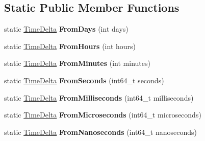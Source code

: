 \subsection*{Static Public Member Functions}
\begin{DoxyCompactItemize}
\item 
static \hyperlink{classv8_1_1base_1_1_time_delta}{Time\+Delta} {\bfseries From\+Days} (int days)\hypertarget{classv8_1_1base_1_1_time_delta_a483ae36e52b6a285f9c9718f829c4ceb}{}\label{classv8_1_1base_1_1_time_delta_a483ae36e52b6a285f9c9718f829c4ceb}

\item 
static \hyperlink{classv8_1_1base_1_1_time_delta}{Time\+Delta} {\bfseries From\+Hours} (int hours)\hypertarget{classv8_1_1base_1_1_time_delta_a2bcb85183e4d97c4fbb83d43547a91d0}{}\label{classv8_1_1base_1_1_time_delta_a2bcb85183e4d97c4fbb83d43547a91d0}

\item 
static \hyperlink{classv8_1_1base_1_1_time_delta}{Time\+Delta} {\bfseries From\+Minutes} (int minutes)\hypertarget{classv8_1_1base_1_1_time_delta_a17fd871515deede9e2f09e9c88bfd79a}{}\label{classv8_1_1base_1_1_time_delta_a17fd871515deede9e2f09e9c88bfd79a}

\item 
static \hyperlink{classv8_1_1base_1_1_time_delta}{Time\+Delta} {\bfseries From\+Seconds} (int64\+\_\+t seconds)\hypertarget{classv8_1_1base_1_1_time_delta_a206d2f5468ed9046e944196a21da2a3d}{}\label{classv8_1_1base_1_1_time_delta_a206d2f5468ed9046e944196a21da2a3d}

\item 
static \hyperlink{classv8_1_1base_1_1_time_delta}{Time\+Delta} {\bfseries From\+Milliseconds} (int64\+\_\+t milliseconds)\hypertarget{classv8_1_1base_1_1_time_delta_aad1814436227004633e537e2bf07d1ff}{}\label{classv8_1_1base_1_1_time_delta_aad1814436227004633e537e2bf07d1ff}

\item 
static \hyperlink{classv8_1_1base_1_1_time_delta}{Time\+Delta} {\bfseries From\+Microseconds} (int64\+\_\+t microseconds)\hypertarget{classv8_1_1base_1_1_time_delta_af71f8e378809ca292689157e6c891c18}{}\label{classv8_1_1base_1_1_time_delta_af71f8e378809ca292689157e6c891c18}

\item 
static \hyperlink{classv8_1_1base_1_1_time_delta}{Time\+Delta} {\bfseries From\+Nanoseconds} (int64\+\_\+t nanoseconds)\hypertarget{classv8_1_1base_1_1_time_delta_a3edac5462c1ecf851c1c0a402aad9897}{}\label{classv8_1_1base_1_1_time_delta_a3edac5462c1ecf851c1c0a402aad9897}


\end{DoxyCompactItemize}
